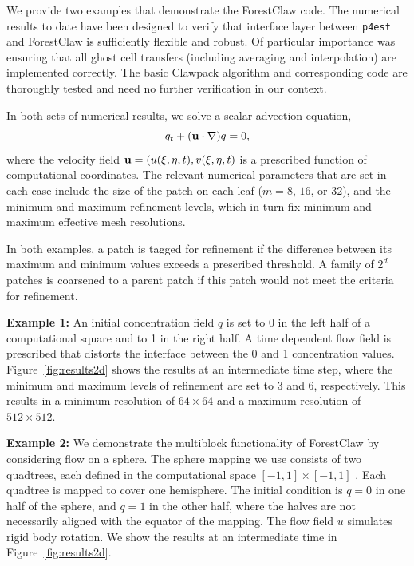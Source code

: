 \documentclass{IOS-Book-Article}     %
\newcommand{\clawpack}{{\sc Clawpack}\xspace}
\newcommand{\forestclaw}{ForestClaw\xspace}
\newcommand{\pforest}{\texttt{p4est}\xspace}
\newcommand{\plotbox}[1]{#1}
\newcommand{\Fig}[1]{Figure~\ref{fig:#1}}
\begin{document}
We provide two examples that demonstrate the \forestclaw code.
The numerical results to date have been designed to verify that
interface layer between \pforest and \forestclaw is sufficiently
flexible and robust.  Of particular importance was ensuring that all
ghost cell transfers (including averaging and
interpolation) are implemented correctly.
The basic \clawpack algorithm and corresponding code are
thoroughly tested and need no further verification in our context.

In both sets of numerical results, we solve a scalar advection
equation,
\begin{equation}
q_t + ({\bf u}\cdot \nabla) q = 0 ,
\end{equation}
where the velocity field ${\bf u} = (u(\xi,\eta,t), v(\xi,\eta,t)$ is
a prescribed function of computational coordinates.  The relevant
numerical parameters that are set in each case include the size of the
patch on each leaf ($m=8$, $16$, or $32$), and the minimum and maximum
refinement levels, which in turn fix minimum and maximum effective mesh
resolutions.

In both examples, a patch is tagged for refinement if the
difference between its maximum and minimum values exceeds a prescribed
threshold.  A family of $2^d$ patches is coarsened to a parent patch
if this patch would not meet the criteria for refinement.

\begin{description}
\item{\bf Example 1:} An initial concentration field $q$
is set to 0 in the left half of a computational square and to 1 in the
right half.  A time dependent flow field is prescribed that distorts
the interface between the 0 and 1 concentration values.  
\Fig{results2d} shows the results at an intermediate time step, where
the minimum and maximum levels of refinement are set to 3 and 6, respectively.
This results in a minimum resolution of $64 \times 64$ and a maximum
resolution of $512 \times 512$.


\item{\bf Example 2:} We demonstrate the
multiblock functionality of \forestclaw by considering flow on a
sphere.  The sphere mapping we use consists of two quadtrees, each
defined in the computational space $[-1,1] \times [-1,1]$
\cite{ca-he-le:2008, be-ca-he-le:2009}.  Each quadtree is mapped to cover one
hemisphere.  The initial condition is $q = 0$ in one half of
the sphere, and $q = 1$ in the other half, where the halves are not
necessarily aligned with the equator of the mapping.  The flow field
${u}$ simulates rigid body rotation.  We show the results at an intermediate
time in \Fig{results2d}.
\end{description}
\end{document}
